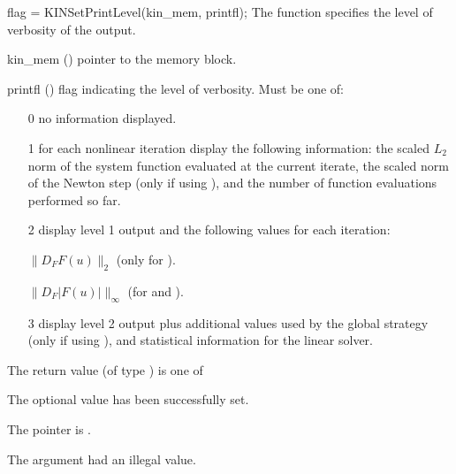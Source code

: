 {
flag = KINSetPrintLevel(kin\_mem, printfl);
}
{
  The function  specifies the level of verbosity
  of the output.
}
{
  \begin{args}

  \item[kin\_mem] ()
    pointer to the {\kinsol} memory block.

  \item[printfl] ()
    flag indicating the level of verbosity. Must be one of:
    
    \begin{itemize}
    \item[0]
      no information displayed.
      
    \item[1]
      for each nonlinear iteration display
      the following information: the scaled
      $L_2$ norm of the system function
      evaluated at the current iterate, the
      scaled norm of the Newton step (only if
      using ), and the
      number of function evaluations performed
      so far.
      
    \item[2]
      display level 1 output and the
      following values for each iteration:
      
      $\|D_F F(u)\|_2$
      (only for ).
      
      $\|D_F |F(u)| \|_\infty$
      (for  and
      ).
      
    \item[3]
      display level 2 output plus additional
      values used by the global strategy
      (only if using ), and
      statistical information for the linear
      solver.
    \end{itemize}

  \end{args}
}
{
  The return value  (of type ) is one of
  \begin{args}
  \item[\Id{KIN\_SUCCESS}] 
    The optional value has been successfully set.
  \item[\Id{KIN\_MEM\_NULL}]
    The  pointer is .
  \item[\Id{KIN\_ILL\_INPUT}]
    The argument  had an illegal value.
  \end{args}
}
